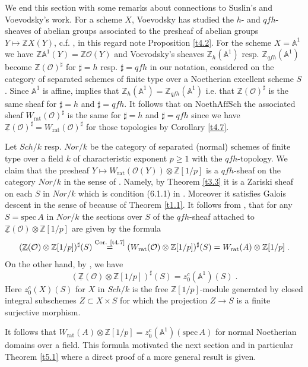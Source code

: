 \documentclass[12pt,leqno]{article}
\newcommand{\A}{{\mathbb{A}}}
\newcommand{\Z}{{\mathbb{Z}}}
\newcommand{\uZ}{\underline{\Z}}
\newcommand{\NAS}{\mathrm{NoethAffSch}}
\newcommand{\spec}{\mathrm{spec}\,}
\newcommand{\rat}{\mathrm{rat}}
\newcommand{\Oh}{{\mathcal O}}
\begin{document}
We end this section with some remarks about connections to Suslin's and Voevodsky's work. For a scheme $X$, Voevodsky has studied the $h$- and $qfh$-sheaves of abelian groups associated to the presheaf of abelian groups $Y \mapsto \Z X (Y)$, c.f. \cite[\S\,2]{V}, in this regard note Proposition \ref{t4.2}. For the scheme $X = \A^1$ we have $\Z \A^1 (Y) = \Z \Oh (Y)$ and Voevodsky's sheaves $\Z_h (\A^1)$ resp. $\Z_{qfh} (\A^1)$ become $\Z (\Oh)^{\sharp}$ for $\sharp = h$ resp. $\sharp = qfh$ in our notation, considered on the category of separated schemes of finite type over a Noetherian excellent scheme $S$. Since $\A^1$ is affine, \cite[Theorem 3.3.5]{V} implies that $\Z_h (\A^1) = \Z_{qfh} (\A^1)$ i.e. that $\Z (\Oh)^{\sharp}$ is the same sheaf for $\sharp = h$ and $\sharp = qfh$. It follows that on $\NAS$ the associated sheaf $W_{\rat} (\Oh)^{\sharp}$ is the same for $\sharp = h$ and $\sharp = qfh$ since we have $\uZ (\Oh)^{\sharp} = W_{\rat} (\Oh)^{\sharp}$ for those topologies by Corollary \ref{t4.7}. 

Let $Sch / k$ resp. $Nor / k$ be the category of separated (normal) schemes of finite type over a field $k$ of characteristic exponent $p \ge 1$ with the $qfh$-topology. We claim that the presheaf $Y \mapsto W_{\rat} (\Oh (Y)) \otimes \Z [1/p]$ is a $qfh$-sheaf on the category $Nor / k$ in the sense of \cite[Definition 6.1]{SV1}. Namely, by Theorem \ref{t3.3} it is a Zariski sheaf on each $S$ in $Nor / k$ which is condition (6.1.1) in \cite{SV1}. Moreover it satisfies Galois descent in the sense of \cite[(6.1.2)]{SV1} because of Theorem \ref{t1.1}. It follows from \cite[\S\,6]{SV1}, that for any $S = \spec A$ in $Nor / k$ the sections over $S$ of the $qfh$-sheaf attached to $\uZ (\Oh) \otimes \Z [1 / p]$ are given by the formula
\begin{equation}
\label{eq:21}
(\uZ (\Oh) \otimes \Z [ 1/p ])^{\sharp} (S) \overset{\text{Cor. \ref{t4.7}}}{=} (W_{\rat} (\Oh) \otimes \Z [ 1/p ] )^{\sharp} (S) = W_{\rat} (A) \otimes \Z [ 1/p ] \; .
\end{equation}
On the other hand, by \cite[Theorem 6.7]{SV1}, we have
\[
(\uZ (\Oh) \otimes \Z [1/p])^{\sharp} (S) = z^c_0 (\A^1) (S) \; .
\]
Here $z^c_0 (X) (S)$ for $X$ in $Sch / k$ is the free $\Z [1/p]$-module generated by closed integral subschemes $Z \subset X \times S$ for which the projection $Z \to S$ is a finite surjective morphism.

It follows that $W_{\rat} (A) \otimes \Z [1/p] = z^c_0 (\A^1) (\spec A)$ for normal Noetherian domains over a field. This formula motivated the next section and in particular Theorem \ref{t5.1} where a direct proof of a more general result is given. 
\end{document}
